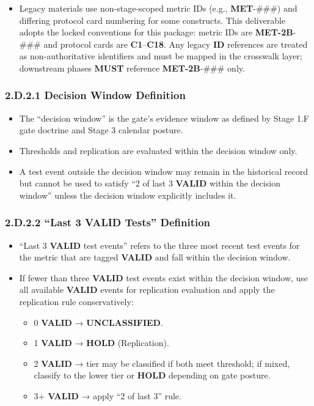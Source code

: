 \documentclass[10pt]{article}
\begin{document}
\begin{itemize}
\item Legacy materials use non-stage-scoped metric IDs (e.g., \textbf{MET}-\#\#\#) and differing protocol card numbering for some constructs. This deliverable adopts the locked conventions for this package: metric IDs are \textbf{MET-2B}-\#\#\# and protocol cards are \textbf{C1}–\textbf{C18}. Any legacy \textbf{ID} references are treated as non-authoritative identifiers and must be mapped in the crosswalk layer; downstream phases \textbf{MUST} reference \textbf{MET-2B}-\#\#\# only.
\end{itemize}

\subsubsection*{2.D.2.1 Decision Window Definition}

\begin{itemize}
\item The “decision window” is the gate’s evidence window as defined by Stage 1.F gate doctrine and Stage 3 calendar posture.
\item Thresholds and replication are evaluated within the decision window only.
\item A test event outside the decision window may remain in the historical record but cannot be used to satisfy “2 of last 3 \textbf{VALID} within the decision window” unless the decision window explicitly includes it.
\end{itemize}

\subsubsection*{2.D.2.2 “Last 3 \textbf{VALID} Tests” Definition }

\begin{itemize}
\item “Last 3 \textbf{VALID} test events” refers to the three most recent test events for the metric that are tagged \textbf{VALID} and fall within the decision window.
\item If fewer than three \textbf{VALID} test events exist within the decision window, use all available \textbf{VALID} events for replication evaluation and apply the replication rule conservatively:
  \begin{itemize}
  \item 0 \textbf{VALID} → \textbf{UNCLASSIFIED}.
  \item 1 \textbf{VALID} → \textbf{HOLD} (Replication).
  \item 2 \textbf{VALID} → tier may be classified if both meet threshold; if mixed, classify to the lower tier or \textbf{HOLD} depending on gate posture.
  \item 3+ \textbf{VALID} → apply “2 of last 3” rule.
  \end{itemize}
\end{itemize}
\end{document}

